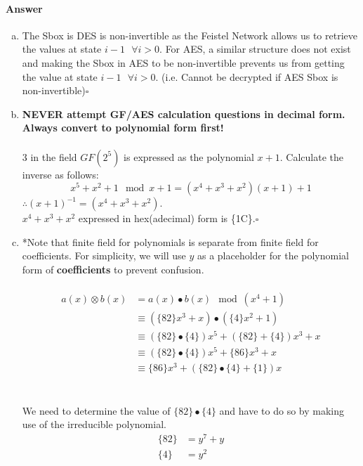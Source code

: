 \documentclass[12pt]{article}
\newcommand{\EOQ}{\hfill $\square$}
\begin{document}
\paragraph{Answer}
\begin{enumerate}[(a)]
\item The Sbox is DES is non-invertible as the Feistel Network allows us to retrieve the values at state $i-1\text{~~}\forall i>0$. For AES, a similar structure does not exist and making the Sbox in AES to be non-invertible prevents us from getting the value at state $i-1\text{~~}\forall i>0$. (i.e. Cannot be decrypted if AES Sbox is non-invertible)\EOQ
\item \textbf{NEVER attempt GF/AES calculation questions in decimal form. Always convert to polynomial form first!}\\\\
3 in the field $GF(2^5)$ is expressed as the polynomial $x+1$. Calculate the inverse as follows:
\begin{equation*}
x^5+x^2+1\mod x+1=(x^4+x^3+x^2)(x+1)+1
\end{equation*}
$\therefore (x+1)^{-1}=(x^4+x^3+x^2)$.\\
$x^4+x^3+x^2$ expressed in hex(adecimal) form is \{1C\}.\EOQ
\item *Note that finite field for polynomials is separate from finite field for coefficients. For simplicity, we will use $y$ as a placeholder for the polynomial form of \textbf{coefficients} to prevent confusion.\\\\\begin{equation*}
\begin{split}
a(x)\otimes b(x)&=a(x)\bullet b(x)\mod (x^4+1)\\
&\equiv (\{82\}x^3+x)\bullet (\{4\}x^2+1)\\
&\equiv (\{82\}\bullet\{4\})x^5+(\{82\}+\{4\})x^3+x\\
&\equiv (\{82\}\bullet\{4\})x^5+\{86\}x^3+x\\
&\equiv \{86\}x^3+(\{82\}\bullet\{4\}+\{1\})x
\end{split}
\end{equation*}\\\\
We need to determine the value of $\{82\}\bullet\{4\}$ and have to do so by making use of the irreducible polynomial.
\begin{equation*}
\begin{split}
\{82\}&=y^7+y\\
\{4\}&=y^2\\

\end{split}
\end{equation*}
\end{enumerate}
\end{document}
